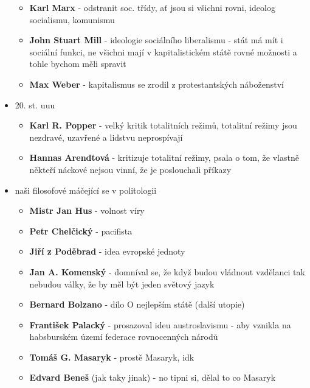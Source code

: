 \documentclass{article}
\begin{document}
\begin{itemize}
\begin{itemize}
    \item \textbf{Karl Marx} - odstranit soc. třídy, ať jsou si všichni rovni, ideolog socialismu, komunismu
    \item \textbf{John Stuart Mill} - ideologie sociálního liberalismu - stát má mít i sociální funkci, ne všichni mají v kapitalistickém státě rovné možnosti a tohle bychom měli spravit
    \item \textbf{Max Weber} - kapitalismus se zrodil z protestantských náboženství
  \end{itemize}
  \item 20. st. uuu
  \begin{itemize}
    \item \textbf{Karl R. Popper} - velký kritik totalitních režimů, totalitní režimy jsou nezdravé, uzavřené a lidstvu neprospívají
    \item \textbf{Hannas Arendtová} - kritizuje totalitní režimy, psala o tom, že vlastně někteří náckové nejsou vinní, že je poslouchali příkazy
  \end{itemize}
  \item naši filosofové máčející se v politologii
  \begin{itemize}
    \item \textbf{Mistr Jan Hus} - volnost víry
    \item \textbf{Petr Chelčický} - pacifista
    \item \textbf{Jiří z Poděbrad} - idea evropské jednoty
    \item \textbf{Jan A. Komenský} - domníval se, že když budou vládnout vzdělanci tak nebudou války, že by měl být jeden světový jazyk
    \item \textbf{Bernard Bolzano} - dílo O nejlepším státě (další utopie)
    \item \textbf{František Palacký} - prosazoval ideu austroslavismu - aby vznikla na habsburském území federace rovnocenných národů
    \item \textbf{Tomáš G. Masaryk} - prostě Masaryk, idk
    \item \textbf{Edvard Beneš} (jak taky jinak) - no tipni si, dělal to co Masaryk
  \end{itemize}
\end{itemize}
\end{document}
